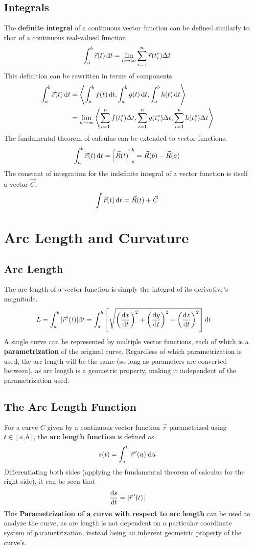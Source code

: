 \documentclass[../Calculus_\Roman{3}]{subfiles}
\begin{document}
			\subsection*{Integrals}
				The \textbf{definite integral} of a continuous vector function can be defined similarly to that of a continuous real-valued function.
					\[\int_a^b\vec{r}(t)\,\mathrm{d} t = \lim_{n\to\infty}\sum_{i = 1}^\infty \vec{r}(t_i^*)\Delta t\]
				This definition can be rewritten in terms of components.
					\begin{align*}
						\int_a^b\vec{r}(t)\,\mathrm{d} t &= \left\langle \int_a^b f(t)\,\mathrm{d} t, \int_a^b g(t)\,\mathrm{d} t, \int_a^b h(t)\,\mathrm{d} t \right\rangle \\ 
							&= \lim_{n\to\infty}\left\langle \sum_{i = 1}^n f(t_i^*)\Delta t, \sum_{i = 1}^n g(t_i^*)\Delta t, \sum_{i = 1}^n h(t_i^*)\Delta t \right\rangle
					\end{align*}
				The fundamental theorem of calculus can be extended to vector functions.
					\[\int_a^b \vec{r}(t)\,\mathrm{d} t = \left[\vec{R}(t)\right]_a^b = \vec{R}(b) - \vec{R}(a)\]
				The constant of integration for the indefinite integral of a vector function is itself a vector $\vec{C}$.
					\[\int \vec{r}(t)\,\mathrm{d} t = \vec{R}(t) + \vec{C}\]
		\section{Arc Length and Curvature}
			\subsection*{Arc Length}
				The arc length of a vector function is simply the integral of its derivative's magnitude.
					\begin{align*}
						L &= \int_a^b|\vec{r}\hspace{0.5mm}'(t)|\mathrm{d} t
								= \int_a^b\left[\sqrt{\left(\frac{\mathrm{d} x}{\mathrm{d} t}\right)^2 + \left(\frac{\mathrm{d} y}{\mathrm{d} t}\right)^2 + \left(\frac{\mathrm{d} z}{\mathrm{d} t}\right)^2}\right]\mathrm{d} t
					\end{align*}
				A single curve can be represented by multiple vector functions, each of which is a \textbf{parametrization} of the original curve. Regardless of which parametrization is used, the arc length will be the same (so long as parameters are converted between), as arc length is a geometric property, making it independent of the parametrization used.
			\subsection*{The Arc Length Function}
				For a curve $C$ given by a continuous vector function $\vec{r}$ parametrized using $t \in [a, b]$, the \textbf{arc length function} is defined as
					\[s(t) = \int_a^t|\vec{r}\hspace{0.5mm}'(u)|\mathrm{d} u\]
				Differentiating both sides (applying the fundamental theorem of calculus for the right side), it can be seen that
					\[\frac{\mathrm{d} s}{\mathrm{d} t} = |\vec{r}\hspace{0.5mm}'(t)|\]
				This \textbf{Parametrization of a curve with respect to arc length} can be used to analyze the curve, as arc length is not dependent on a particular coordinate system of parametrization, instead being an inherent geometric property of the curve's.
\end{document}

